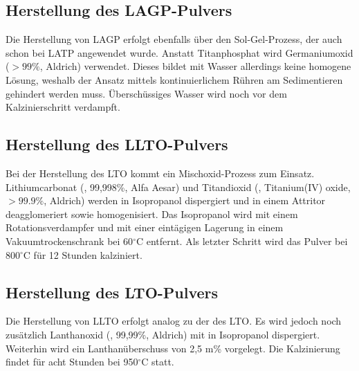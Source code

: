 \documentclass[a4paper, 11pt, headsepline,footsepline,twoside,abstract]{scrbook}
\begin{document}
\subsection{Herstellung des LAGP-Pulvers}
\label{praep_LAGP}
Die Herstellung von LAGP erfolgt ebenfalls über den Sol-Gel-Prozess, der auch schon bei LATP angewendet wurde. Anstatt Titanphosphat wird Germaniumoxid ($>99\%$, Aldrich) verwendet. Dieses bildet mit Wasser allerdings keine homogene Lösung, weshalb der Ansatz mittels kontinuierlichem Rühren am Sedimentieren gehindert werden muss. Überschüssiges Wasser wird noch vor dem Kalzinierschritt verdampft.
\subsection{Herstellung des LLTO-Pulvers}
\label{praep_LTO}
Bei der Herstellung des LTO kommt ein Mischoxid-Prozess zum Einsatz. Lithiumcarbonat (, 99,998\%, Alfa Aesar) und Titandioxid (, Titanium(IV) oxide, $>99.9\%$, Aldrich) werden in Isopropanol dispergiert und in einem Attritor deagglomeriert sowie homogenisiert. Das Isopropanol wird mit einem Rotationsverdampfer und mit einer eintägigen Lagerung in einem Vakuumtrockenschrank bei 60$^\circ$C entfernt. Als letzter Schritt wird das Pulver bei 800$^\circ$C für 12 Stunden kalziniert.
\subsection{Herstellung des LTO-Pulvers}
\label{praep_LLTO}
Die Herstellung von LLTO erfolgt analog zu der des LTO. Es wird jedoch noch zusätzlich Lanthanoxid (, 99,99\%, Aldrich) mit in Isopropanol dispergiert. Weiterhin wird ein Lanthanüberschuss von 2,5 m\% vorgelegt. Die Kalzinierung findet für acht Stunden bei 950$^\circ$C statt.
\end{document}
